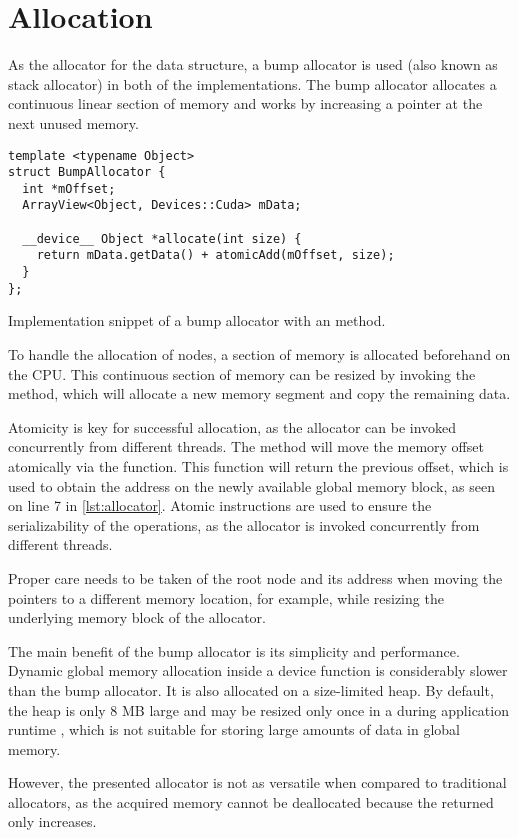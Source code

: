 \section{Allocation}

As the allocator for the data structure, a bump allocator is used (also known as stack allocator) in both of the implementations. The bump allocator allocates a continuous linear section of memory and works by increasing a pointer at the next unused memory.

\begin{listing}
  \begin{verbatim}
template <typename Object>
struct BumpAllocator { 
  int *mOffset;
  ArrayView<Object, Devices::Cuda> mData;

  __device__ Object *allocate(int size) {
    return mData.getData() + atomicAdd(mOffset, size);
  }
};
  \end{verbatim}
  \caption{Implementation snippet of a bump allocator with an  method.}
  \label{lst:allocator}
\end{listing}

To handle the allocation of nodes, a section of memory is allocated beforehand on the CPU. This continuous section of memory can be resized by invoking the  method, which will allocate a new memory segment and copy the remaining data.

Atomicity is key for successful allocation, as the allocator can be invoked concurrently from different threads. The  method will move the memory offset atomically via the  function. This function will return the previous offset, which is used to obtain the address on the newly available global memory block, as seen on line 7 in \cref{lst:allocator}. Atomic instructions are used to ensure the serializability of the operations, as the allocator is invoked concurrently from different threads.

Proper care needs to be taken of the root node and its address when moving the pointers to a different memory location, for example, while resizing the underlying memory block of the allocator.

The main benefit of the bump allocator is its simplicity and performance. Dynamic global memory allocation inside a device function is considerably slower \cite{vinkler2015register} than the bump allocator. It is also allocated on a size-limited heap. By default, the heap is only 8 MB large and may be resized only once in a during application runtime \cite{cudaprog}, which is not suitable for storing large amounts of data in global memory.

However, the presented allocator is not as versatile when compared to traditional allocators, as the acquired memory cannot be deallocated because the returned  only increases.
